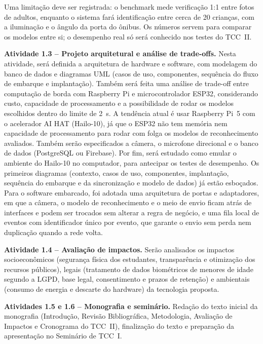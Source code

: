 \documentclass[
    12pt,
    oneside,
    a4paper,
    article,
    english,
    brazil
    ]{abntex2}
\begin{document}
Uma limitação deve ser registrada: o benchmark mede verificação 1:1 entre
fotos de adultos, enquanto o sistema fará identificação entre cerca de 20
crianças, com a iluminação e o ângulo da porta do ônibus. Os números servem
para comparar os modelos entre si; o desempenho real só será conhecido nos
testes do TCC~II.

\textbf{Atividade 1.3 -- Projeto arquitetural e análise de trade-offs.} Nesta
atividade, será definida a arquitetura de hardware e software, com modelagem do
banco de dados e diagramas UML (casos de uso, componentes, sequência do fluxo de
embarque e implantação). Também será feita uma análise de trade-off entre
computação de borda com Raspberry Pi e microcontrolador ESP32, considerando
custo, capacidade de processamento e a possibilidade de rodar os modelos
escolhidos dentro do limite de 2~s. A tendência atual é usar Raspberry Pi~5
com o acelerador AI HAT (Hailo-10), já que o ESP32 não tem memória nem
capacidade de processamento para rodar com folga os modelos de reconhecimento
avaliados. Também serão especificados a câmera, o microfone direcional e o
banco de dados (PostgreSQL ou Firebase). Por fim, será estudado como emular o
ambiente do Hailo-10 no computador, para antecipar os testes de desempenho.
Os primeiros diagramas (contexto, casos de uso, componentes, implantação,
sequência do embarque e da sincronização e modelo de dados) já estão esboçados.
Para o software embarcado, foi adotada uma arquitetura de portas e adaptadores,
em que a câmera, o modelo de reconhecimento e o meio de envio ficam atrás de
interfaces e podem ser trocados sem alterar a regra de negócio, e uma fila
local de eventos com identificador único por evento, que garante o envio sem
perda nem duplicação quando a rede volta.

\textbf{Atividade 1.4 -- Avaliação de impactos.} Serão analisados os impactos
socioeconômicos (segurança física dos estudantes, transparência e otimização
dos recursos públicos), legais (tratamento de dados biométricos de menores de
idade segundo a LGPD, base legal, consentimento e prazos de retenção) e
ambientais (consumo de energia e descarte do hardware) da tecnologia proposta.

\textbf{Atividades 1.5 e 1.6 -- Monografia e seminário.} Redação do texto inicial
da monografia (Introdução, Revisão Bibliográfica, Metodologia, Avaliação de
Impactos e Cronograma do TCC~II), finalização do texto e preparação da
apresentação no Seminário de TCC~I.
\end{document}
